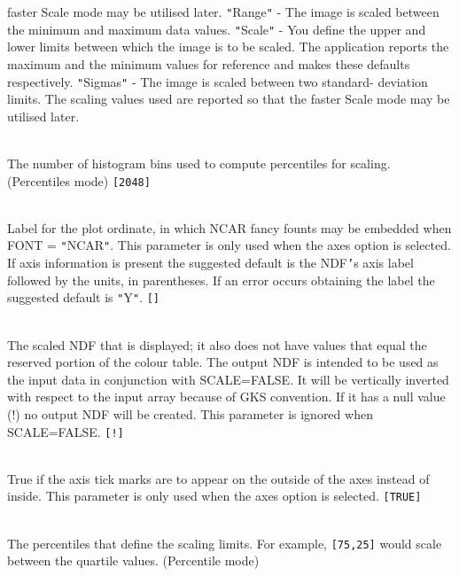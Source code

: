 \documentclass[twoside,11pt]{article}
\newcommand{\sstsubsection}[1]{ \item[{#1}] \mbox{} \\}
\newcommand{\sstsubsection}[1]{\item[{#1}]}
\begin{document}
{{{                           faster Scale mode may be utilised later.
           {\tt "}Range{\tt "}       - The image is scaled between the minimum and
                           maximum data values.
           {\tt "}Scale{\tt "}       - You define the upper and lower limits
                           between which the image is to be scaled.  The
                           application reports the maximum and the
                           minimum values for reference and makes these
                           defaults respectively.
           {\tt "}Sigmas{\tt "}      - The image is scaled between two standard-
                           deviation limits.  The scaling values used
                           are reported so that the faster Scale mode
                           may be utilised later.
      }
      \sstsubsection{
         NUMBIN  =  \_INTEGER (Read)
      }{
         The number of histogram bins used to compute percentiles for
         scaling. (Percentiles mode) {\tt [2048]}
      }
      \sstsubsection{
         ORDLAB  =  LITERAL (Read)
      }{
         Label for the plot ordinate, in which NCAR fancy founts
         may be embedded when FONT = {\tt "}NCAR{\tt "}.   This parameter is only
         used when the axes option is selected.  If axis information is
         present the suggested default is the NDF{\tt '}s axis label followed
         by the units, in parentheses.  If an error occurs obtaining
         the label the suggested default is {\tt "}Y{\tt "}. {\tt []}
      }
      \sstsubsection{
         OUT = NDF (Write)
      }{
         The scaled NDF that is displayed; it also does not have
         values that equal the reserved portion of the colour table.
         The output NDF is intended to be used as the input data in
         conjunction with SCALE=FALSE.  It will be vertically
         inverted with respect to the input array because of GKS
         convention.  If it has a null value (!) no output NDF will be
         created.  This parameter is ignored when SCALE=FALSE. {\tt [!]}
      }
      \sstsubsection{
         OUTTIC = \_LOGICAL (Read)
      }{
         True if the axis tick marks are to appear on the outside of
         the axes instead of inside.   This parameter is only used
         when the axes option is selected. {\tt [TRUE]}
      }
      \sstsubsection{
         PERCENTILES( 2 ) = \_REAL (Read)
      }{
         The percentiles that define the scaling limits. For example,
         {\tt [75,25]} would scale between the quartile values. (Percentile
         mode)
      }
      \sstsubsection{
         PLTITL = LITERAL (Read)
}}}
\end{document}

